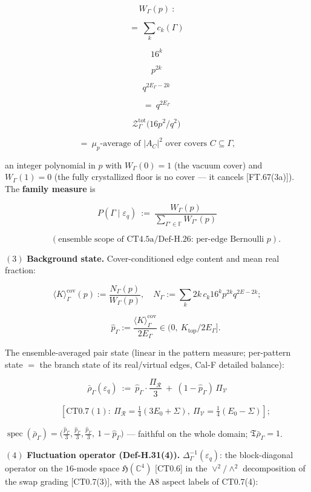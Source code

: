 \begin{definition}
\[
W_\Gamma(p)\ :
\]

\[
= \ \sum_k c_k(\Gamma)\,
\]

\[
16^k\,
\]

\[
p^{2k}\,
\]

\[
q^{2E_\Gamma-2k}\
\]

\[
= \ q^{2E_\Gamma}\,
\]

\[
\mathcal Z^{\mathrm{tot}}_\Gamma\bigl(16p^2/q^2\bigr)\
\]

\[
= \ \mu_p\text{-average of }|A_C|^2\text{ over covers }C\subseteq\Gamma,
\]

an integer polynomial in $p$ with $W_\Gamma(0)=1$ (the vacuum cover) and $W_\Gamma(1)=0$ (the fully crystallized floor is no cover — it cancels [FT.67(3a)]). The \textbf{family measure} is

\[
P(\Gamma\mid\varepsilon_q)\ :=\ \frac{W_\Gamma(p)}{\sum_{\Gamma'\in\mathbb F}W_{\Gamma'}(p)}
\]

\[
\qquad (\text{ensemble scope of CT4.5a/Def-H.26: per-edge Bernoulli }p).
\]

$(3)$ \textbf{Background state.} Cover-conditioned edge content and mean real fraction:

\[
\langle K\rangle^{\mathrm{cov}}_\Gamma(p):=\frac{N_\Gamma(p)}{W_\Gamma(p)},\quad N_\Gamma:=\sum_k 2k\,c_k 16^k p^{2k}q^{2E-2k};
\]

\[
\qquad \hat p_\Gamma:=\frac{\langle K\rangle^{\mathrm{cov}}_\Gamma}{2E_\Gamma}\in(0,\ K_{\mathrm{top}}/2E_\Gamma].
\]

The ensemble-averaged pair state (linear in the pattern measure; per-pattern state $=$ the branch state of its real/virtual edges, Cal-F detailed balance):

\[
\bar\rho_\Gamma(\varepsilon_q)\ :=\ \hat p_\Gamma\cdot\frac{\Pi_{\mathcal R}}{3}\ +\ (1-\hat p_\Gamma)\,\Pi_{\mathcal V}
\]

\[
\qquad [\mathrm{CT0.7}(1):\ \Pi_{\mathcal R}=\tfrac14(3E_0+\Sigma),\ \Pi_{\mathcal V}=\tfrac14(E_0-\Sigma)];
\]

$\operatorname{spec}(\bar\rho_\Gamma)=\bigl(\tfrac{\hat p_\Gamma}3,\tfrac{\hat p_\Gamma}3,\tfrac{\hat p_\Gamma}3,\ 1-\hat p_\Gamma\bigr)$ — faithful on the whole domain; $\mathfrak T\bar\rho_\Gamma=1$.

$(4)$ \textbf{Fluctuation operator (Def-H.31(4)).} $\Delta^{-1}_\Gamma(\varepsilon_q)$: the block-diagonal operator on the $16$-mode space $\mathfrak H(\mathbb C^4)$ [CT0.6] in the $\vee^2/\wedge^2$ decomposition of the swap grading [CT0.7(3)], with the A8 aspect labels of CT0.7(4):


\end{definition}
